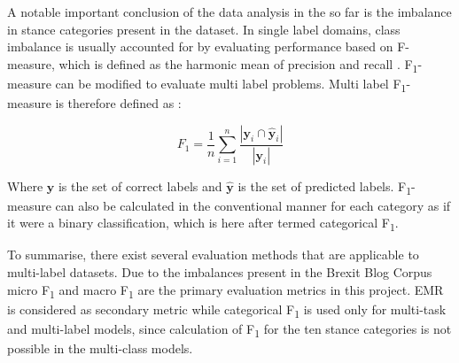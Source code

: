 \documentclass[Dissertation.tex]{subfiles}
\begin{document}
A notable important conclusion of the data analysis in the so far is the imbalance in stance categories present in the dataset. In single label domains, class imbalance is usually accounted for by evaluating performance based on F-measure, which is defined as the harmonic mean of precision and recall \cite{sorowerLiteratureSurveyAlgorithms2018}. F\textsubscript{1}-measure can be modified to evaluate multi label problems. Multi label F\textsubscript{1}-measure is therefore defined as \cite{sorowerLiteratureSurveyAlgorithms2018}:

\[ F_1 = \frac{1}{n}\sum_{i=1}^{n}\frac{|\mathbf{y}_i \cap \mathbf{\hat{y}}_i|}{|\mathbf{y}_i|}\] 

Where $ \mathbf{y} $ is the set of correct labels and $ \mathbf{\hat{y}} $ is the set of predicted labels. F\textsubscript{1}-measure can also be calculated in the conventional manner for each category as if it were a binary classification, which is here after termed categorical F\textsubscript{1}.


To summarise, there exist several evaluation methods that are applicable to multi-label datasets. Due to the imbalances present in the Brexit Blog Corpus micro F\textsubscript{1} and macro F\textsubscript{1} are the primary evaluation metrics in this project. EMR is considered as secondary metric while categorical F\textsubscript{1} is used only for multi-task and multi-label models, since calculation of F\textsubscript{1} for the ten stance categories is not possible in the multi-class models. 
\end{document}
